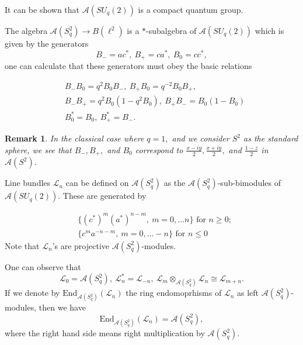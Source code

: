 \documentclass[12pt]{article}
\newtheorem{remark}[definition]{Remark}
\numberwithin{equation}{section}
\def\End{{\mathrm {End}}}
\def\A{\mathcal{A}}
\def\L{\mathcal{L}}
\begin{document}
It can be shown that $\A(SU_q(2))$ is a compact quantum group.


The algebra $\A(S_q^2)\to B(\ell^2)$ is a $*$-subalgebra of $\A(SU_q(2))$ which is given by the generators 
\begin{equation}\label{eq: generators of A(CP1)}
B_- =ac^*,~ B_+=ca^*,~ B_0=cc^*,
\end{equation}
one can calculate that these generators must obey the basic relations

\begin{equation}
    \begin{split}
        &B_-B_0=q^2B_0B_{-},~ B_{+}B_0=q^{-2}B_0B_{+},\\
        &B_-B_+=q^2B_0(1-q^2B_0),~B_+B_-=B_0(1-B_0)\\
        &B_0^*=B_0,~ B_+^*=B_-.
    \end{split}
\end{equation}

\begin{remark}
In the classical case where $q = 1,$ and we consider $S^2$ as the standard sphere, we see that $B_-, B_+,$ and $B_0$ correspond to $\frac{x-iy}{2}, \frac{x+iy}{2},$ and $\frac{1-z}{2}$ in $\A(S^2).$
\end{remark}


Line bundles $\L_n$ can be defined on $\A(S_q^2)$ as the $\A(S_q^2)$-sub-bimodules of $\A(SU_q(2)).$ These are generated by 

\begin{equation}
    \begin{split}
        &\{(c^*)^m(a^*)^{n-m},~m=0,\ldots n\} \text{ for }n\geq 0;\\
        &\{c^ma^{-n-m},~m=0,\ldots -n\} \text{ for }n\leq 0
    \end{split}
\end{equation}
Note that $\L_n$'s are projective $\A(S_q^2)$-modules.

One can observe that 
\begin{equation}\label{eq: line bundle product}
\L_0=\A(S_q^2),~\L_n^*=\L_{-n},~ \L_m\otimes_{\A(S_q^2)}\L_n\cong \L_{m+n}.
\end{equation}
If we denote by $\End_{\A(S_q^2)}(\L_n)$ the ring endomoprhisms of $\L_n$ as left $\A(S_q^2)$-modules, then we have 
\begin{equation}\label{eq: end of line bundles}
\End_{\A(S_q^2)}(\L_n)=\A(S_q^2),
\end{equation}
where the right hand side means right multiplication by $\A(S_q^2)$.
\end{document}
